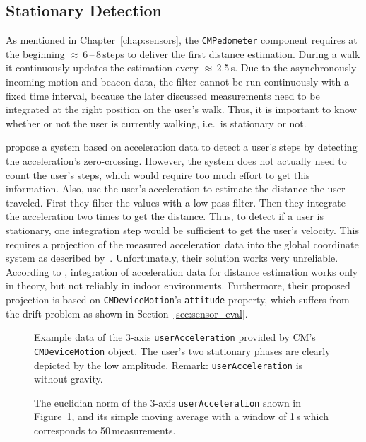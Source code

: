 \subsection{Stationary Detection}\label{sec:algo_stationary}
As mentioned in Chapter~\ref{chap:sensors}, the \texttt{CMPedometer} component requires at the beginning $\approx$\,6\,--\,8\,steps to deliver the first distance estimation. During a walk it continuously updates the estimation every $\approx$\,2.5\,s. Due to the asynchronously incoming motion and beacon data, the filter cannot be run continuously with a fixed time interval, because the later discussed measurements need to be integrated at the right position on the user's walk. Thus, it is important to know whether or not the user is currently walking, i.e.\ is stationary or not.

\citet{wang:wlan} propose a system based on acceleration data to detect a user's steps by detecting the acceleration's zero-crossing. However, the system does not actually need to count the user's steps, which would require too much effort to get this information. Also, \citet{shanklin:embedded_sensors} use the user's acceleration to estimate the distance the user traveled. First they filter the values with a low-pass filter. Then they integrate the acceleration two times to get the distance. Thus, to detect if a user is stationary, one integration step would be sufficient to get the user's velocity. This requires a projection of the measured acceleration data into the global coordinate system as described by~\citet{shanklin:embedded_sensors}. Unfortunately, their solution works very unreliable. According to \citet{wang:wlan}, integration of acceleration data for distance estimation works only in theory, but not reliably in indoor environments. Furthermore, their proposed projection is based on \texttt{CMDeviceMotion}'s \texttt{attitude} property, which suffers from the drift problem as shown in Section~\ref{sec:sensor_eval}.

\begin{figure}[p]
	
	\caption{Example data of the 3-axis \texttt{userAcceleration} provided by \acs{CM}'s \texttt{CMDeviceMotion} object. The user's two stationary phases are clearly depicted by the low amplitude. Remark: \texttt{userAcceleration} is without gravity.}
	\label{fig:mm_stationary_1}
\end{figure}

\begin{figure}[p]
	
	\caption{The euclidian norm of the 3-axis \texttt{userAcceleration} shown in Figure~\ref{fig:mm_stationary_1}, and its simple moving average with a window of 1\,s which corresponds to 50\,measurements.}
	\label{fig:mm_stationary_2}
\end{figure}

